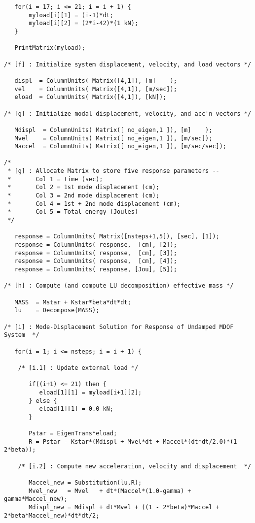 \begin{footnotesize}
\begin{verbatim}
   for(i = 17; i <= 21; i = i + 1) {
       myload[i][1] = (i-1)*dt;
       myload[i][2] = (2*i-42)*(1 kN);
   }

   PrintMatrix(myload);

/* [f] : Initialize system displacement, velocity, and load vectors */

   displ  = ColumnUnits( Matrix([4,1]), [m]    );
   vel    = ColumnUnits( Matrix([4,1]), [m/sec]);
   eload  = ColumnUnits( Matrix([4,1]), [kN]);

/* [g] : Initialize modal displacement, velocity, and acc'n vectors */

   Mdispl  = ColumnUnits( Matrix([ no_eigen,1 ]), [m]    );
   Mvel    = ColumnUnits( Matrix([ no_eigen,1 ]), [m/sec]);
   Maccel  = ColumnUnits( Matrix([ no_eigen,1 ]), [m/sec/sec]);

/* 
 * [g] : Allocate Matrix to store five response parameters --
 *       Col 1 = time (sec);
 *       Col 2 = 1st mode displacement (cm);
 *       Col 3 = 2nd mode displacement (cm);
 *       Col 4 = 1st + 2nd mode displacement (cm);
 *       Col 5 = Total energy (Joules)
 */ 

   response = ColumnUnits( Matrix([nsteps+1,5]), [sec], [1]);
   response = ColumnUnits( response,  [cm], [2]);
   response = ColumnUnits( response,  [cm], [3]);
   response = ColumnUnits( response,  [cm], [4]);
   response = ColumnUnits( response, [Jou], [5]);

/* [h] : Compute (and compute LU decomposition) effective mass */

   MASS  = Mstar + Kstar*beta*dt*dt;
   lu    = Decompose(MASS);

/* [i] : Mode-Displacement Solution for Response of Undamped MDOF System  */

   for(i = 1; i <= nsteps; i = i + 1) {

    /* [i.1] : Update external load */

       if((i+1) <= 21) then {
          eload[1][1] = myload[i+1][2];
       } else {
          eload[1][1] = 0.0 kN;
       } 

       Pstar = EigenTrans*eload;
       R = Pstar - Kstar*(Mdispl + Mvel*dt + Maccel*(dt*dt/2.0)*(1-2*beta));

    /* [i.2] : Compute new acceleration, velocity and displacement  */

       Maccel_new = Substitution(lu,R); 
       Mvel_new   = Mvel   + dt*(Maccel*(1.0-gamma) + gamma*Maccel_new);
       Mdispl_new = Mdispl + dt*Mvel + ((1 - 2*beta)*Maccel + 2*beta*Maccel_new)*dt*dt/2;


\end{verbatim}
\end{footnotesize}
